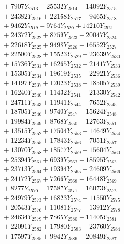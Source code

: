 \documentclass[a4paper,10pt]{article}
\begin{document}
{\begin{align}
&\;  + 7907 Y_{2513} + 25532 Y_{2514} + 14092 Y_{2515} \\[0.3ex]
&\;  + 24382 Y_{2516} + 22168 Y_{2517} + 9465 Y_{2518} \\[0.5ex]\allowbreak
&\;  + 9462 Y_{2519} + 9764 Y_{2520} + 14210 Y_{2521} \\[0.3ex]
&\;  + 24372 Y_{2522} + 8759 Y_{2523} + 20047 Y_{2524} \\[0.3ex]
&\;  + 22618 Y_{2525} + 9498 Y_{2526} + 16552 Y_{2527} \\[0.3ex]
&\;  + 22500 Y_{2528} + 15523 Y_{2529} + 23639 Y_{2530} \\[0.3ex]
&\;  + 15736 Y_{2531} + 16265 Y_{2532} + 21417 Y_{2533} \\[0.3ex]
&\;  + 15305 Y_{2534} + 19619 Y_{2535} + 22921 Y_{2536} \\[0.3ex]
&\;  + 14197 Y_{2537} + 12023 Y_{2538} + 18505 Y_{2539} \\[0.3ex]
&\;  + 16240 Y_{2540} + 11432 Y_{2541} + 21330 Y_{2542} \\[0.3ex]
&\;  + 24711 Y_{2543} + 11941 Y_{2544} + 7652 Y_{2545} \\[0.3ex]
&\;  + 18705 Y_{2546} + 9740 Y_{2547} + 15624 Y_{2548} \\[0.5ex]\allowbreak
&\;  + 19984 Y_{2549} + 8768 Y_{2550} + 12763 Y_{2551} \\[0.3ex]
&\;  + 13515 Y_{2552} + 17504 Y_{2553} + 14649 Y_{2554} \\[0.3ex]
&\;  + 12234 Y_{2555} + 17843 Y_{2556} + 7051 Y_{2557} \\[0.3ex]
&\;  + 13070 Y_{2558} + 18577 Y_{2559} + 15604 Y_{2560} \\[0.3ex]
&\;  + 25394 Y_{2561} + 6939 Y_{2562} + 18595 Y_{2563} \\[0.3ex]
&\;  + 23713 Y_{2564} + 19394 Y_{2565} + 24609 Y_{2566} \\[0.3ex]
&\;  + 24172 Y_{2567} + 7266 Y_{2568} + 16448 Y_{2569} \\[0.3ex]
&\;  + 8277 Y_{2570} + 17587 Y_{2571} + 16073 Y_{2572} \\[0.3ex]
&\;  + 24979 Y_{2573} + 16823 Y_{2574} + 11550 Y_{2575} \\[0.3ex]
&\;  + 20543 Y_{2576} + 11081 Y_{2577} + 13912 Y_{2578} \\[0.5ex]\allowbreak
&\;  + 24634 Y_{2579} + 7865 Y_{2580} + 11405 Y_{2581} \\[0.3ex]
&\;  + 22091 Y_{2582} + 17980 Y_{2583} + 23760 Y_{2584} \\[0.3ex]
&\;  + 17597 Y_{2585} + 9942 Y_{2586} + 20849 Y_{2587} \\[0.3ex]

\end{align}}
\end{document}
